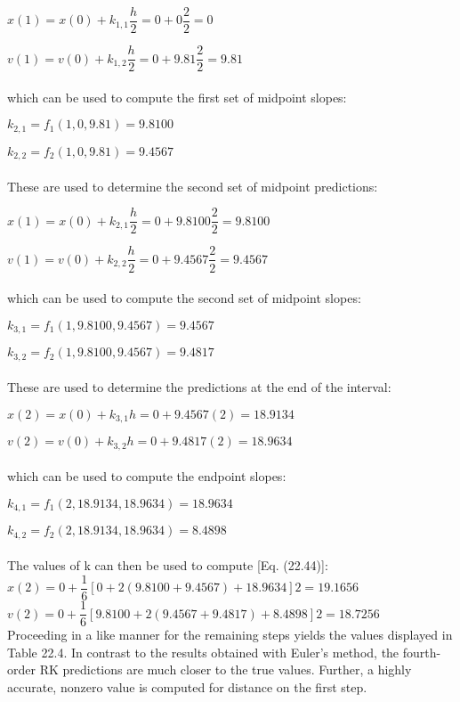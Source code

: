 $x(1) = x(0) + k_{1,1}\dfrac{h}{2} = 0 + 0\dfrac{2}{2} = 0$

$v(1) = v(0) + k_{1,2} \dfrac{h}{2} = 0 + 9.81\dfrac{2}{2} = 9.81$\\
\\
which can be used to compute the first set of midpoint slopes:

$k_{2,1} = f_1(1,0,9.81) = 9.8100$

$k_{2,2} = f_2(1,0,9.81) = 9.4567$\\
\\
These are used to determine the second set of midpoint predictions:

$x(1) = x(0) + k_{2,1} \dfrac{h}{2} = 0 + 9.8100 \dfrac{2}{2} = 9.8100$

$v(1) = v(0) + k_{2,2} \dfrac{h}{2} = 0 + 9.4567 \dfrac{2}{2} = 9.4567$\\
\\
which can be used to compute the second set of midpoint slopes:

$k_{3,1} = f_1(1, 9.8100, 9.4567) = 9.4567$

$k_{3,2} = f_2(1, 9.8100, 9.4567) = 9.4817$\\
\\
These are used to determine the predictions at the end of the interval:

$x(2) = x(0) + k_{3,1}h = 0 + 9.4567(2) = 18.9134$

$v(2) = v(0) + k_{3,2}h = 0 + 9.4817(2) = 18.9634$\\
\\
which can be used to compute the endpoint slopes:

$k_{4,1} = f_1(2, 18.9134, 18.9634) = 18.9634$

$k_{4,2} = f_2(2, 18.9134, 18.9634) = 8.4898$\\
\\
The values of k can then be used to compute [Eq. (22.44)]:\\

$ x(2) = 0 + \dfrac{1}{6} [0 + 2(9.8100 + 9.4567) + 18.9634] 2 = 19.1656$\\

$ v(2) = 0 + \dfrac{1}{6} [9.8100 + 2(9.4567 + 9.4817) + 8.4898] 2 = 18.7256$\\

Proceeding in a like manner for the remaining steps yields the values displayed in
Table 22.4. In contrast to the results obtained with Euler’s method, the fourth-order RK
predictions are much closer to the true values. Further, a highly accurate, nonzero value is
computed for distance on the first step.


